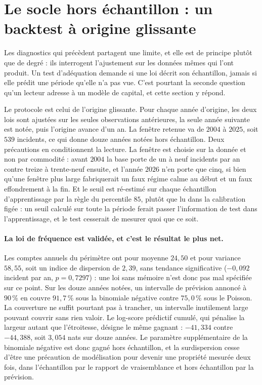 \section{Le socle hors échantillon : un backtest à origine glissante}
\label{soc:sec:backtest}

Les diagnostics qui précèdent partagent une limite, et elle est de principe plutôt que de
degré : ils interrogent l'ajustement sur les données mêmes qui l'ont produit. Un test
d'adéquation demande si une loi décrit son échantillon, jamais si elle prédit une période
qu'elle n'a pas vue. C'est pourtant la seconde question qu'un lecteur adresse à un modèle de
capital, et cette section y répond.

Le protocole est celui de l'origine glissante. Pour chaque année d'origine, les deux lois sont
ajustées sur les seules observations antérieures, la seule année suivante est notée, puis
l'origine avance d'un an. La fenêtre retenue va de $2004$ à $2025$, soit $539$ incidents, ce qui
donne douze années notées hors échantillon. Deux précautions en conditionnent la lecture. La
fenêtre est choisie sur la donnée et non par commodité : avant $2004$ la base porte de un à neuf
incidents par an contre treize à trente-neuf ensuite, et l'année $2026$ n'en porte que cinq, si
bien qu'une fenêtre plus large fabriquerait un faux régime calme au début et un faux
effondrement à la fin. Et le seuil est ré-estimé sur chaque échantillon d'apprentissage
par la règle du percentile $85$, plutôt que lu dans la calibration figée : un seuil calculé sur
toute la période ferait passer l'information de test dans l'apprentissage, et le test cesserait
de mesurer quoi que ce soit.

\paragraph{La loi de fréquence est validée, et c'est le résultat le plus net.} Les comptes
annuels du périmètre ont pour moyenne $24{,}50$ et pour variance $58{,}55$, soit un indice de
dispersion de $2{,}39$, sans tendance significative ($-0{,}092$ incident par an, $p=0{,}7297$) :
une loi sans mémoire n'est donc pas mal spécifiée sur ce point. Sur les douze années notées, un
intervalle de prévision annoncé à $90\,\%$ en couvre $91{,}7\,\%$ sous la binomiale négative
contre $75{,}0\,\%$ sous le Poisson. La couverture ne suffit pourtant pas à trancher, un
intervalle inutilement large pouvant couvrir sans rien valoir. Le log-score prédictif
cumulé, qui pénalise la largeur autant que l'étroitesse, désigne le même gagnant :
$-41{,}334$ contre $-44{,}388$, soit $3{,}054$ nats sur douze années. Le paramètre
supplémentaire de la binomiale négative est donc gagné hors échantillon, et la surdispersion
cesse d'être une précaution de modélisation pour devenir une propriété mesurée deux fois, dans
l'échantillon par le rapport de vraisemblance et hors échantillon par la prévision.

